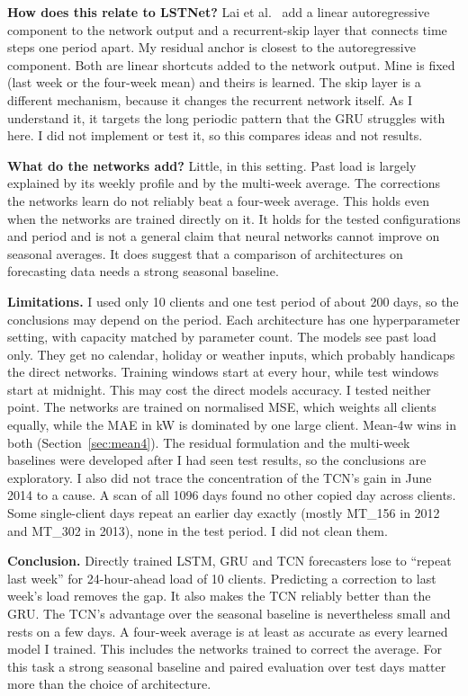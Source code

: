 \documentclass[10pt,a4paper]{article}
\begin{document}
\textbf{How does this relate to LSTNet?} Lai et al.\ \cite{lai} add a linear autoregressive component to the network output and a recurrent-skip layer that connects time steps one period apart. My residual anchor is closest to the autoregressive component. Both are linear shortcuts added to the network output. Mine is fixed (last week or the four-week mean) and theirs is learned. The skip layer is a different mechanism, because it changes the recurrent network itself. As I understand it, it targets the long periodic pattern that the GRU struggles with here. I did not implement or test it, so this compares ideas and not results.

\textbf{What do the networks add?} Little, in this setting. Past load is largely explained by its weekly profile and by the multi-week average. The corrections the networks learn do not reliably beat a four-week average. This holds even when the networks are trained directly on it. It holds for the tested configurations and period and is not a general claim that neural networks cannot improve on seasonal averages. It does suggest that a comparison of architectures on forecasting data needs a strong seasonal baseline.

\textbf{Limitations.} I used only 10 clients and one test period of about 200 days, so the conclusions may depend on the period. Each architecture has one hyperparameter setting, with capacity matched by parameter count. The models see past load only. They get no calendar, holiday or weather inputs, which probably handicaps the direct networks. Training windows start at every hour, while test windows start at midnight. This may cost the direct models accuracy. I tested neither point. The networks are trained on normalised MSE, which weights all clients equally, while the MAE in kW is dominated by one large client. Mean-4w wins in both (Section~\ref{sec:mean4}). The residual formulation and the multi-week baselines were developed after I had seen test results, so the conclusions are exploratory. I also did not trace the concentration of the TCN's gain in June 2014 to a cause. A scan of all 1096 days found no other copied day across clients. Some single-client days repeat an earlier day exactly (mostly MT\_156 in 2012 and MT\_302 in 2013), none in the test period. I did not clean them.

\textbf{Conclusion.} Directly trained LSTM, GRU and TCN forecasters lose to ``repeat last week'' for 24-hour-ahead load of 10 clients. Predicting a correction to last week's load removes the gap. It also makes the TCN reliably better than the GRU. The TCN's advantage over the seasonal baseline is nevertheless small and rests on a few days. A four-week average is at least as accurate as every learned model I trained. This includes the networks trained to correct the average. For this task a strong seasonal baseline and paired evaluation over test days matter more than the choice of architecture.
\end{document}
